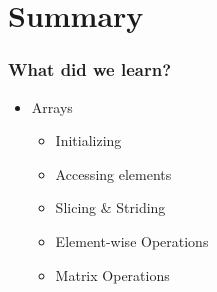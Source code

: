 \documentclass[14pt,compress]{beamer}
\begin{document}
\section{Summary}
\begin{frame}
  \frametitle{What did we learn?}
  \begin{itemize}
  \item Arrays
    \begin{itemize}
    \item Initializing
    \item Accessing elements
    \item Slicing \& Striding
    \item Element-wise Operations
    \item Matrix Operations
    \end{itemize}
  \end{itemize}
\end{frame}
\end{document}
